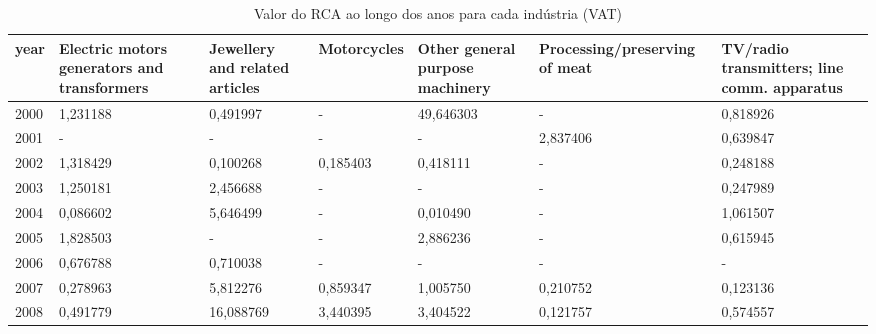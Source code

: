 \begin{table}
\centering
\caption{Valor do RCA ao longo dos anos para cada indústria (VAT)}
\begin{tabular}{p{1cm}p{2cm}p{2cm}p{2cm}p{2cm}p{2cm}p{2cm}}
\toprule
 year &  Electric motors generators and transformers &  Jewellery and related articles &  Motorcycles &  Other general purpose machinery &  Processing/preserving of meat &  TV/radio transmitters; line comm. apparatus \\
\midrule
 2000 &                                     1,231188 &                        0,491997 &            - &                        49,646303 &                              - &                                     0,818926 \\
 2001 &                                            - &                               - &            - &                                - &                       2,837406 &                                     0,639847 \\
 2002 &                                     1,318429 &                        0,100268 &     0,185403 &                         0,418111 &                              - &                                     0,248188 \\
 2003 &                                     1,250181 &                        2,456688 &            - &                                - &                              - &                                     0,247989 \\
 2004 &                                     0,086602 &                        5,646499 &            - &                         0,010490 &                              - &                                     1,061507 \\
 2005 &                                     1,828503 &                               - &            - &                         2,886236 &                              - &                                     0,615945 \\
 2006 &                                     0,676788 &                        0,710038 &            - &                                - &                              - &                                            - \\
 2007 &                                     0,278963 &                        5,812276 &     0,859347 &                         1,005750 &                       0,210752 &                                     0,123136 \\
 2008 &                                     0,491779 &                       16,088769 &     3,440395 &                         3,404522 &                       0,121757 &                                     0,574557 \\

\end{tabular}
\end{table}
